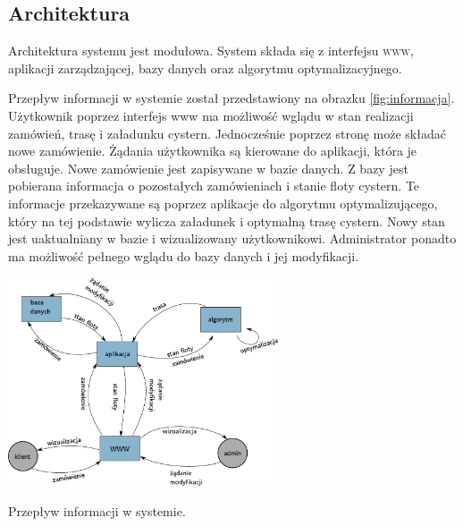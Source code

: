 \documentclass[11pt,a4paper,oneside]{mwart}
\begin{document}
\subsection{Architektura}
Architektura systemu jest modułowa. System składa się z interfejsu \textsc{www}, aplikacji zarządzającej, bazy danych oraz algorytmu optymalizacyjnego.

Przepływ informacji w systemie został przedstawiony na obrazku \ref{fig:informacja}. Użytkownik poprzez interfejs www ma możliwość wglądu w stan realizacji zamówień, trasę i załadunku cystern. Jednocześnie poprzez stronę może składać nowe zamówienie. Żądania użytkownika są kierowane do aplikacji, która je obsługuje. Nowe zamówienie jest zapisywane w bazie danych. Z bazy jest pobierana informacja o pozostałych zamówieniach i stanie floty cystern. Te informacje przekazywane są poprzez aplikacje do algorytmu optymalizującego, który na tej podstawie wylicza załadunek i optymalną trasę cystern.  Nowy stan jest uaktualniany w bazie i wizualizowany użytkownikowi.
Administrator ponadto ma możliwość pełnego wglądu do bazy danych i jej modyfikacji.

\begin{schemat}
  \centering
  \includegraphics[width=0.6\textwidth]{pics/przep_inf.pdf}
  \caption{Przepływ informacji w systemie.}
  \label{fig:informacja}
\end{schemat}

\end{document}

